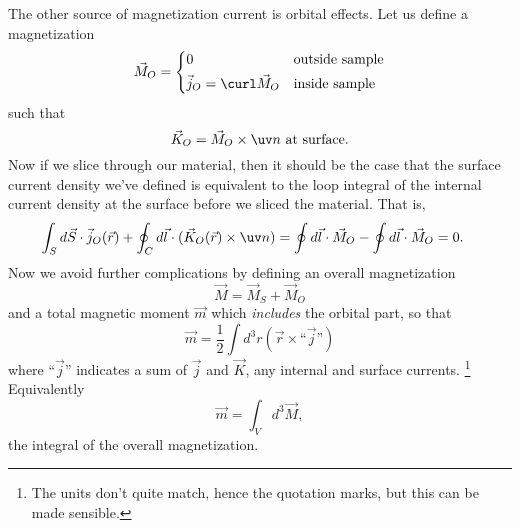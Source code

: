 The other source of magnetization current is orbital effects. Let us define a magnetization
\begin{equation}
    \vec M_O = \begin{cases*}
        0 & outside sample\\
        \vec j_O = \curl \vec M_O & inside sample
    \end{cases*}
\end{equation}
such that
\begin{equation}
    \vec K_O = \vec M_O \times \uv n \text{ at surface}.
\end{equation}
Now if we slice through our material, then it should be the case that the surface current density we've defined is equivalent to the loop integral of the internal current density at the surface before we sliced the material. That is,
\begin{align}
    \int_S d\vec S \cdot \vec j_O (\vec r) + \oint_C d\vec l \cdot (\vec K_O(\vec r) \times \uv n) &= \oint d\vec l \cdot \vec M_O - \oint d\vec l \cdot \vec M_O =0.
\end{align}
Now we avoid further complications by defining an overall magnetization
\begin{equation}
    \vec M = \vec M_S + \vec M_O
\end{equation}
and a total magnetic moment $\vec m$ which \emph{includes} the orbital part, so that
\begin{equation}
    \vec m = \frac{1}{2} \int d^3 r(\vec r \times \text{``$\vec j$''})
\end{equation}
where ``$\vec j$'' indicates a sum of $\vec j$ and $\vec K$, any internal and surface currents.%
    \footnote{The units don't quite match, hence the quotation marks, but this can be made sensible.}
Equivalently
\begin{equation}
    \vec m = \int_V d^3 \vec M,
\end{equation}
the integral of the overall magnetization.